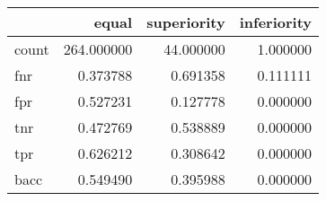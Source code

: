 \begin{tabular}{lrrr}
\toprule
{} &       equal &  superiority &  inferiority \\
\midrule
count &  264.000000 &    44.000000 &     1.000000 \\
fnr   &    0.373788 &     0.691358 &     0.111111 \\
fpr   &    0.527231 &     0.127778 &     0.000000 \\
tnr   &    0.472769 &     0.538889 &     0.000000 \\
tpr   &    0.626212 &     0.308642 &     0.000000 \\
bacc  &    0.549490 &     0.395988 &     0.000000 \\
\bottomrule
\end{tabular}
